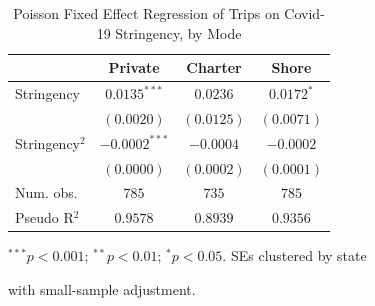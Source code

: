 \documentclass[12pt]{article}
\begin{document}
\newpage{}



\newpage

\begin{table}
\caption{Poisson Fixed Effect Regression of Trips on Covid-19 Stringency, by Mode}
\begin{center}
\begin{threeparttable}
\begin{tabular}{l c c c}
\toprule
 & Private & Charter & Shore \\
\midrule
Stringency     & $0.0135^{***}$  & $0.0236$   & $0.0172^{*}$ \\
               & $(0.0020)$      & $(0.0125)$ & $(0.0071)$   \\
Stringency$^2$ & $-0.0002^{***}$ & $-0.0004$  & $-0.0002$    \\
               & $(0.0000)$      & $(0.0002)$ & $(0.0001)$   \\
\midrule
Num. obs.      & $785$           & $735$      & $785$        \\
Pseudo R$^2$   & $0.9578$        & $0.8939$   & $0.9356$     \\
\bottomrule
\end{tabular}
\begin{tablenotes}[flushleft]
\scriptsize{
\item $^{***}p<0.001$; $^{**}p<0.01$; $^{*}p<0.05$. SEs clustered by state 
\item with small-sample adjustment.
}
\end{tablenotes}
\end{threeparttable}
\label{regResults}
\end{center}
\end{table}
\end{document}

